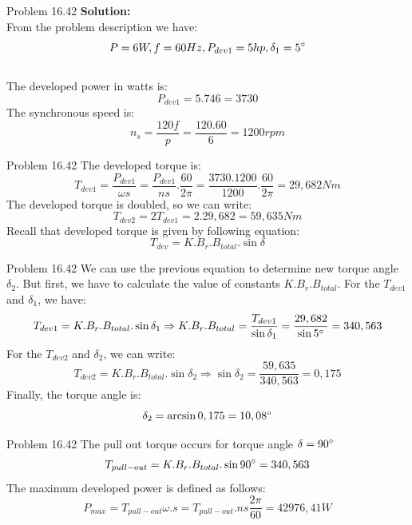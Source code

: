 \documentclass[11pt,aspectratio=169]{beamer}
\begin{document}
\begin{frame}{Problem 16.42}
 \textbf{Solution:}
\\ From the problem description we have:
$$P=6W, f=60 Hz, P_{dev1}=5hp, \delta_{1}=5\degree$$
\\The developed power in watts is:
$$P_{dev1}=5.746=3730$$
The synchronous speed is:
$$n_{s}=\frac{120f}{p}=\frac{120.60}{6}=1200 rpm$$
\end{frame}
\begin{frame}{Problem 16.42}
The developed torque is:
$$T_{dev1}=\frac{P_{dev1}}{\omega s}=\frac{P_{dev1}}{ns}.\frac{60}{2\pi}=\frac{3730.1200}{1200}.\frac{60}{2\pi}=29,682 Nm$$
The developed torque is doubled, so we can write:
$$T_{dev2}=2T_{dev1}=2.29,682=59,635 Nm$$
Recall that developed torque is given by following equation:
$$T_{dev}=K.B_{r}.B_{total}.\sin{\delta}$$
\end{frame}
\begin{frame}{Problem 16.42}
    We can use the previous equation to determine new torque angle $\delta_{2}$. But first, we have to calculate the value of constants $K.B_{r}.B_{total}$.
    For the $T_{dev1}$ and $\delta_{1}$, we have:
    $$T_{dev1}=K.B_{r}.B_{total}.\sin{\delta_{1}}\Rightarrow K.B_{r}.B_{total}=\frac{T_{dev1}}{\sin{\delta_{1}}}=\frac{29,682}{\sin{5\degree}}=340,563$$
    For the $T_{dev2}$ and $\delta_{2}$, we can write:
    $$T_{dev2}=K.B_{r}.B_{total}.\sin{\delta_{2}}\Rightarrow \sin{\delta_{2}}=\frac{59,635}{340,563}=0,175$$
    Finally, the torque angle is:
$$\delta_{2}=\arcsin{0,175}=10,08\degree$$
\end{frame}
\begin{frame}{Problem 16.42}
    The pull out torque occurs for torque angle $\delta=90\degree$
$$T_{pull-out}=K.B_{r}.B_{total}.\sin{90\degree}=340,563$$
The maximum developed power is defined as follows:
$$P_{max}=T_{pull-out}\omega.s=T_{pull-out}.ns\frac{2\pi}{60}=42976,41 W$$
\end{frame}
\end{document}
